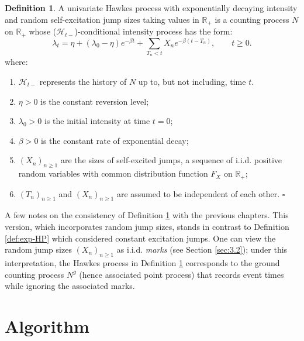 \documentclass[12pt,a4paper]{report}
\theoremstyle{plain}
\theoremstyle{definition}
\newtheorem{definition}{Definition}[section]
\theoremstyle{remark}
\newcommand{\1}{\mathbf{1}}
\begin{document}
\begin{definition}\label{def:random-jump-exp-HP}
A univariate Hawkes process with exponentially decaying intensity and random self-excitation jump sizes taking values in $\mathbb{R}_+$ is a counting process $N$ on $\mathbb{R}_+$ whose ($\mathcal{H}_{t-}$)-conditional intensity process has the form:
\begin{equation}\label{eq:exp-intensity-2}
\lambda_t = \eta + (\lambda_0 - \eta) e^{-\beta t} + \sum_{T_n < t} X_n e^{-\beta(t-T_n)}, \qquad t\ge0.
\end{equation}
where:
\begin{enumerate}
    \item $\mathcal{H}_{t-}$ represents the history of $N$ up to, but not including, time $t$.
    \item $\eta > 0$ is the constant reversion level;
    \item $\lambda_0 > 0$ is the initial intensity at time $t=0$;
    \item $\beta > 0$ is the constant rate of exponential decay;
    \item $(X_n)_{n\ge 1}$ are the sizes of self-excited jumps, a sequence of i.i.d. positive random variables with common distribution function $F_X$ on $\mathbb{R}_+$;
    \item $(T_n)_{n\ge 1}$ and $(X_n)_{n\ge 1}$ are assumed to be independent of each other. \hfill $\square$
\end{enumerate}
\end{definition}
\medskip
\noindent
A few notes on the consistency of Definition \ref{def:random-jump-exp-HP} with the previous chapters. This version, which incorporates random jump sizes, stands in contrast to Definition \ref{def:exp-HP} which considered constant excitation jumps. One can view the random jump sizes $(X_n)_{n\ge 1}$ as i.i.d. \emph{marks} (see Section \ref{sec:3.2}); under this interpretation, the Hawkes process in Definition \ref{def:random-jump-exp-HP} corresponds to the ground counting process $N^g$ (hence associated point process) that records event times while ignoring the associated marks.

\section{Algorithm}\label{sec:7.1}
\end{document}
